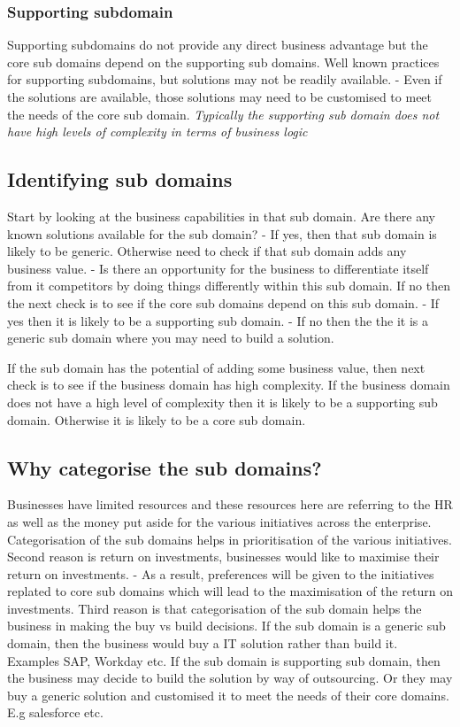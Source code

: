 \subsubsection{Supporting subdomain}
Supporting subdomains do not provide any direct business advantage but the core sub domains depend on the supporting sub domains.
Well known practices for supporting subdomains, but solutions may not be readily available.
- Even if the solutions are available, those solutions may need to be customised to meet the needs of the core sub domain.
\textit{Typically the supporting sub domain does not have high levels of complexity in terms of business logic}

\subsection{Identifying sub domains}
Start by looking at the business capabilities in that sub domain.
Are there any known solutions available for the sub domain?
- If yes, then that sub domain is likely to be generic.
Otherwise need to check if that sub domain adds any business value.
- Is there an opportunity for the business to differentiate itself from it competitors by doing things differently within this sub domain.
If no then the next check is to see if the core sub domains depend on this sub domain.
- If yes then it is likely to be a supporting sub domain.
- If no then the the it is a generic sub domain where you may need to build a solution.

If the sub domain has the potential of adding some business value, then next check is to see if the business domain has high complexity.
If the business domain does not have a high level of complexity then it is likely to be a supporting sub domain.
Otherwise it is likely to be a core sub domain.

\subsection{Why categorise the sub domains?}
Businesses have limited resources and these resources here are referring to the HR as well as the money put aside for the various initiatives across the enterprise.
Categorisation of the sub domains helps in prioritisation of the various initiatives.
Second reason is return on investments, businesses would like to maximise their return on investments.
- As a result, preferences will be given to the initiatives replated to core sub domains which will lead to the maximisation of the return on investments.
Third reason is that categorisation of the sub domain helps the business in making the buy vs build decisions.
If the sub domain is a generic sub domain, then the business would buy a IT solution rather than build it.
Examples SAP, Workday etc.
If the sub domain is supporting sub domain, then the business may decide to build the solution by way of outsourcing.
Or they may buy a generic solution and customised it to meet the needs of their core domains. E.g salesforce etc.


